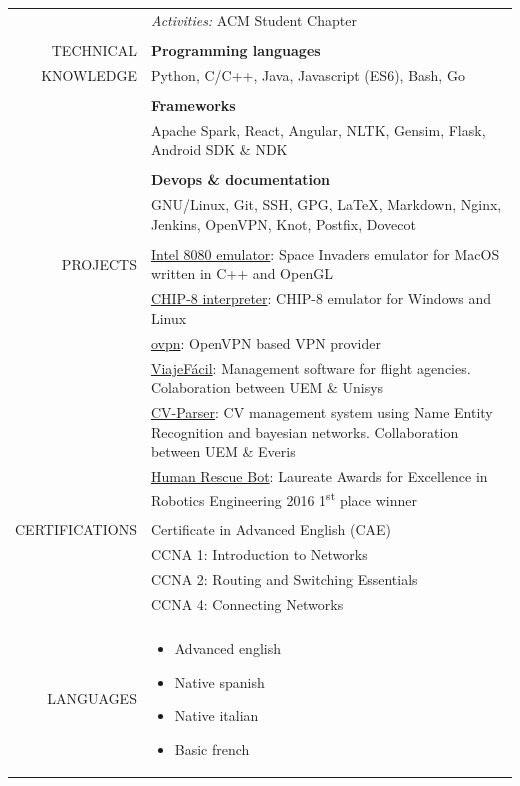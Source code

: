 \documentclass[a4paper, 11pt]{article}
\begin{document}
\begin{longtable}{r|p{12cm}}
    \\
    & \textit{Activities:} ACM Student Chapter
    \\\\
    TECHNICAL
    & \textbf{Programming languages}
    \\
    KNOWLEDGE
    & Python, C/C++, Java, Javascript (ES6), Bash, Go
    \\\\
    & \textbf{Frameworks}
    \\
    & Apache Spark, React, Angular, NLTK, Gensim, Flask, Android SDK \& NDK
    \\\\
    & \textbf{Devops \& documentation}
    \\
    & GNU/Linux, Git, SSH, GPG, \LaTeX, Markdown, Nginx, Jenkins, OpenVPN, Knot, Postfix, Dovecot
    \\\\
    PROJECTS
    & \href{https://github.com/hugo19941994/SpaceInvaders-Emu}{Intel 8080 emulator}: Space Invaders emulator for MacOS written in C++ and OpenGL
    \\
    & \href{https://github.com/hugo19941994/CHIP8-Emu}{CHIP-8 interpreter}: CHIP-8 emulator for Windows and Linux
    \\
    & \href{https://vpn.hugofs.com}{ovpn}: OpenVPN based VPN provider
    \\
    & \href{https://github.com/hugo19941994/ViajeFacil}{ViajeFácil}: Management software for flight agencies. Colaboration between UEM \& Unisys
    \\
    & \href{https://github.com/hugo19941994/CV-Parser}{CV-Parser}: CV management system using Name Entity Recognition and bayesian networks. Collaboration between UEM \& Everis
    \\
    & \href{https://github.com/hugo19941994/robot}{Human Rescue Bot}: Laureate Awards for Excellence in Robotics Engineering 2016 1\textsuperscript{st} place winner
    \\\\
    CERTIFICATIONS
    & Certificate in Advanced English (CAE)
    \\
    & CCNA 1: Introduction to Networks
    \\
    & CCNA 2: Routing and Switching Essentials
    \\
    & CCNA 4: Connecting Networks
    \\\\
    LANGUAGES
    & \vspace{-1.85\baselineskip} %
    \begin{multicols}{2}
        \begin{itemize}[leftmargin=0cm, label={}, noitemsep]
            \item Advanced english
            \item Native spanish
            \item Native italian
            \item Basic french
        \end{itemize}
    \end{multicols}
\end{longtable}
\end{document}
